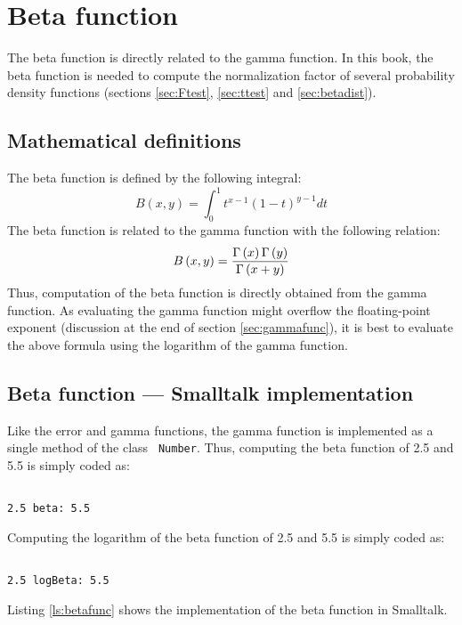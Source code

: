 \documentclass[twoside]{book}
\begin{document}
\section{Beta function}
\label{sec:betafunc} The beta function is directly related to the
gamma function. In this book, the beta function is needed to
compute the normalization factor of several probability density
functions (\cf sections \ref{sec:Ftest}, \ref{sec:ttest} and
\ref{sec:betadist}).
\subsection{Mathematical definitions}
The beta function is defined by the following integral:
\begin{equation}
\label{eq:betaint} B\left(x,y\right)=\int_0^1
t^{x-1}\left(1-t\right)^{y-1}dt
\end{equation}
The beta function is related to the gamma function with the
following relation:
\begin{equation}
B\left(x,y\right)={\Gamma\left(x\right)\Gamma\left(y\right)\over\Gamma\left(x+y\right)}
\end{equation}
Thus, computation of the beta function is directly obtained from
the gamma function. As evaluating the gamma function might
overflow the floating-point exponent (\cf discussion at the end of
section \ref{sec:gammafunc}), it is best to evaluate the above
formula using the logarithm of the gamma function.

\subsection{Beta function --- Smalltalk implementation}
 Like the error and gamma functions, the
gamma function is implemented as a single method of the class {\tt
Number}. Thus, computing the beta function of 2.5 and 5.5 is
simply coded as:
\begin{codeExample}
\begin{verbatim}

2.5 beta: 5.5
\end{verbatim}
\end{codeExample} Computing the logarithm of the beta function of
2.5 and 5.5 is simply coded as:
\begin{codeExample}
\begin{verbatim}

2.5 logBeta: 5.5
\end{verbatim}
\end{codeExample}
Listing \ref{ls:betafunc} shows the
implementation of the beta function in Smalltalk.
\end{document}
